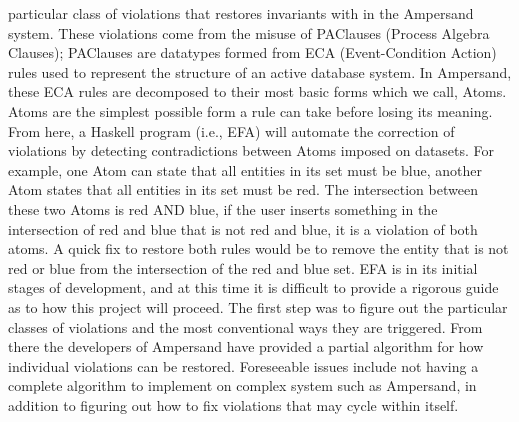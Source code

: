 \documentclass[12pt]{article}
\begin{document}
particular 
class of violations that restores invariants with in the Ampersand system. 
These violations come from the misuse of PAClauses (Process Algebra Clauses); 
PAClauses are datatypes formed from ECA (Event-Condition Action) rules used to 
represent the structure of an active database system. In Ampersand, these ECA 
rules are decomposed to their most basic forms which we call, Atoms. Atoms are 
the simplest possible form a rule can take before losing its meaning. From 
here, a Haskell program (i.e., EFA) will automate the correction of violations 
by detecting contradictions between Atoms imposed on datasets. For example, one 
Atom can state that all entities in its set must be blue, another Atom states 
that all entities in its set must be red. The intersection between these two 
Atoms is red AND blue, if the user inserts something in the intersection of red 
and blue that is not red and blue, it is a violation of both atoms. A quick fix 
to restore both rules would be to remove the entity that is not red or blue 
from the intersection of the red and blue set. 
\newline
\indent EFA is in its initial stages of development, and at this time it is 
difficult 
to provide a rigorous guide as to how this project will proceed. The first step 
was to figure out the particular classes of violations and the most 
conventional ways they are triggered. From there the developers of Ampersand 
have provided a partial algorithm for how individual violations can be 
restored. Foreseeable issues include not having a complete algorithm to 
implement on complex system such as Ampersand, in addition to figuring out how 
to fix violations that may cycle within itself.
\end{document}
